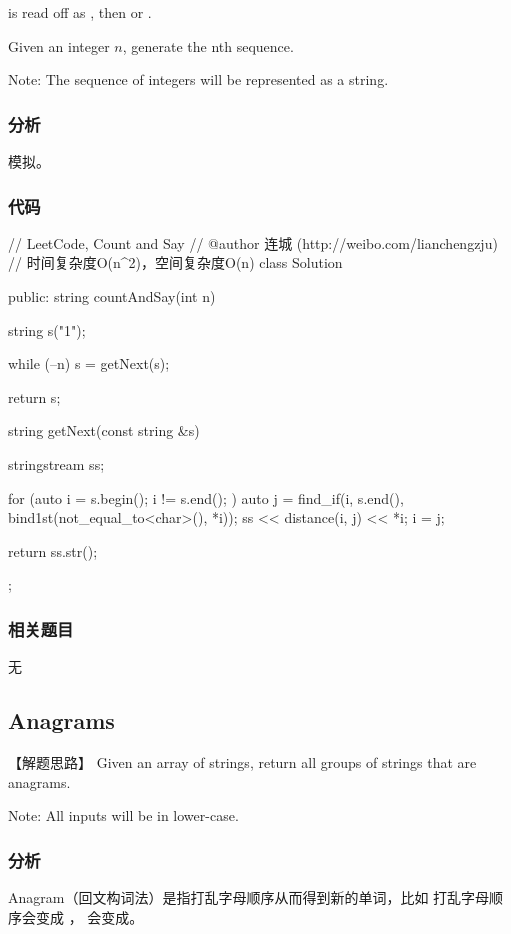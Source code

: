  is read off as , then  or .

Given an integer $n$, generate the nth sequence.

Note: The sequence of integers will be represented as a string.


\subsubsection{分析}
模拟。


\subsubsection{代码}
\begin{Code}
	// LeetCode, Count and Say
	// @author 连城 (http://weibo.com/lianchengzju)
	// 时间复杂度O(n^2)，空间复杂度O(n)
	class Solution {
		public:
		string countAndSay(int n) {
			string s("1");
			
			while (--n)
			s = getNext(s);
			
			return s;
		}
		
		string getNext(const string &s) {
			stringstream ss;
			
			for (auto i = s.begin(); i != s.end(); ) {
				auto j = find_if(i, s.end(), bind1st(not_equal_to<char>(), *i));
				ss << distance(i, j) << *i;
				i = j;
			}
			
			return ss.str();
		}
	};
\end{Code}


\subsubsection{相关题目}
\begindot
\item 无
\myenddot


\subsection{Anagrams} %
\label{sec:anagrams}


【解题思路】
Given an array of strings, return all groups of strings that are anagrams.

Note: All inputs will be in lower-case.


\subsubsection{分析}
Anagram（回文构词法）是指打乱字母顺序从而得到新的单词，比如  打乱字母顺序会变成  ， 会变成。


